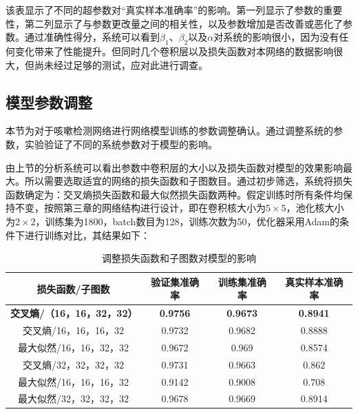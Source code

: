 该表显示了不同的超参数对“真实样本准确率”的影响。第一列显示了参数的重要性，第二列显示了与参数更改量之间的相关性，以及参数增加是否改善或恶化了参数。通过准确性得分，系统可以看到\(\beta_1\)、\(\beta_2\)以及\(\alpha\)对系统的影响很小，因为没有任何变化带来了性能提升。但同时几个卷积层以及损失函数对本网络的数据影响很大，但尚未经过足够的测试，应对此进行调查。
\subsection{模型参数调整}
本节为对于咳嗽检测网络进行网络模型训练的参数调整确认。通过调整系统的参数，实验验证了不同的系统参数对于模型的影响。

由上节的分析系统可以看出参数中卷积层的大小以及损失函数对模型的效果影响最大。所以需要选取适宜的网络的损失函数和子图数目。通过初步筛选，系统将损失函数确定为：交叉熵损失函数和最大似然损失函数两种。假定训练时所有条件均保持不变，按照第三章的网络结构进行设计，即在卷积核大小为\(5\times5\)，池化核大小为\(2\times2\)，训练集为1800，batch数目为128，训练次数为50，优化器采用Adam的条件下进行训练对比，其结果如下：
\begin{table}[h]
\centering
\begin{tabular}{cccc}
\hline
\textbf{损失函数/子图数}                                 & \textbf{验证集准确率}                        & \textbf{训练集准确率}                        & \textbf{真实样本准确率}                       \\ \hline
{\color[HTML]{FE0000} \textbf{交叉熵/（16，16，32，32）}} & {\color[HTML]{FE0000} \textbf{0.9756}} & {\color[HTML]{FE0000} \textbf{0.9673}} & {\color[HTML]{FE0000} \textbf{0.8941}} \\
交叉熵/16，16，16，32                                   & 0.9732                                 & 0.9682                                 & 0.8888                                 \\
最大似然/16，16，32，32                                  & 0.9672                                 & 0.969                                  & 0.8574                                 \\
交叉熵/32，32，32，32                                   & 0.9731                                 & 0.9663                                 & 0.862                                  \\
最大似然/16，16，16，32                                  & 0.9142                                 & 0.9008                                 & 0.708                                  \\
最大似然/32，32，32，32                                  & 0.9678                                 & 0.9669                                 & 0.8914                                 \\ \hline
\end{tabular}
\caption{调整损失函数和子图数对模型的影响}
\end{table}

